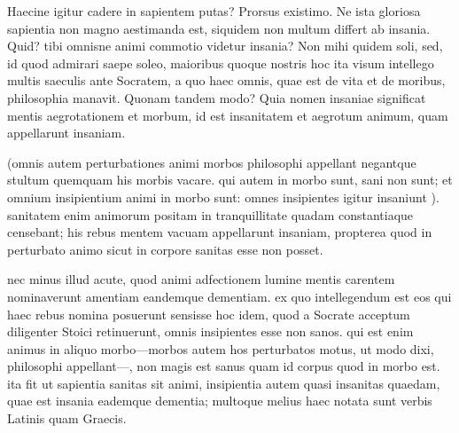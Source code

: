  Haecine igitur cadere in sapientem putas? Prorsus existimo. Ne ista gloriosa sapientia non magno aestimanda est, siquidem non multum differt ab insania. Quid? tibi omnisne animi commotio videtur insania? Non mihi quidem soli, sed, id quod admirari saepe soleo, maioribus quoque nostris hoc ita visum intellego multis saeculis ante Socratem, a quo haec omnis, quae est de vita et de moribus, philosophia manavit. Quonam tandem modo? Quia nomen insaniae significat mentis aegrotationem et morbum, id est insanitatem et aegrotum animum, quam appellarunt insaniam.

 (omnis autem perturbationes animi morbos philosophi appellant negantque stultum quemquam his morbis vacare. qui autem in morbo sunt, sani non sunt; et omnium insipientium animi in morbo sunt: omnes insipientes igitur insaniunt ). sanitatem enim animorum positam in tranquillitate quadam constantiaque censebant; his rebus mentem vacuam appellarunt insaniam, propterea quod in perturbato animo sicut in corpore sanitas esse non posset.

 nec minus illud acute, quod animi adfectionem lumine mentis carentem nominaverunt amentiam eandemque dementiam. ex quo intellegendum est eos qui haec rebus nomina posuerunt sensisse hoc idem, quod a Socrate acceptum diligenter Stoici retinuerunt, omnis insipientes esse non sanos. qui est enim animus in aliquo morbo—morbos autem hos perturbatos motus, ut modo dixi, philosophi appellant—, non magis est sanus quam id corpus quod in morbo est. ita fit ut sapientia sanitas sit animi, insipientia autem quasi insanitas quaedam, quae est insania eademque dementia; multoque melius haec notata sunt verbis Latinis quam Graecis.

